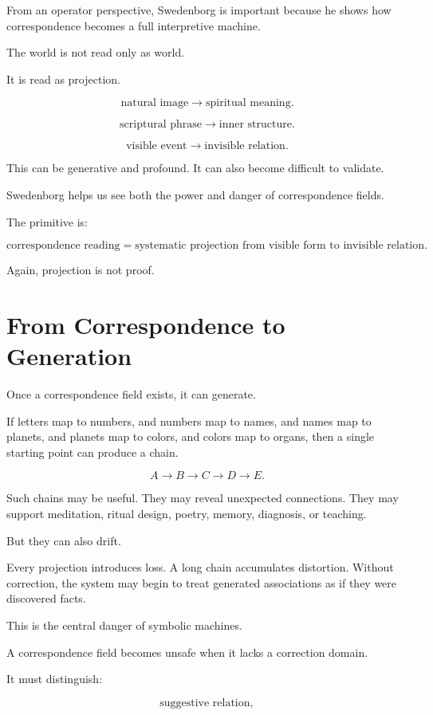 \documentclass[11pt]{book}
\begin{document}
From an operator perspective, Swedenborg is important because he shows how correspondence becomes a full interpretive machine.

The world is not read only as world.

It is read as projection.

\[
\text{natural image} \rightarrow \text{spiritual meaning}.
\]

\[
\text{scriptural phrase} \rightarrow \text{inner structure}.
\]

\[
\text{visible event} \rightarrow \text{invisible relation}.
\]

This can be generative and profound. It can also become difficult to validate.

Swedenborg helps us see both the power and danger of correspondence fields.

The primitive is:

\[
\text{correspondence reading} = \text{systematic projection from visible form to invisible relation}.
\]

Again, projection is not proof.

\section{From Correspondence to Generation}

Once a correspondence field exists, it can generate.

If letters map to numbers, and numbers map to names, and names map to planets, and planets map to colors, and colors map to organs, then a single starting point can produce a chain.

\[
A \rightarrow B \rightarrow C \rightarrow D \rightarrow E.
\]

Such chains may be useful. They may reveal unexpected connections. They may support meditation, ritual design, poetry, memory, diagnosis, or teaching.

But they can also drift.

Every projection introduces loss. A long chain accumulates distortion. Without correction, the system may begin to treat generated associations as if they were discovered facts.

This is the central danger of symbolic machines.

A correspondence field becomes unsafe when it lacks a correction domain.

It must distinguish:

\[
\text{suggestive relation},
\]
\end{document}

